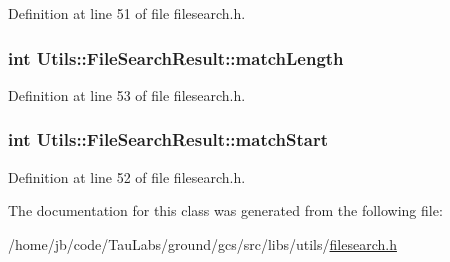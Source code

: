 \-Definition at line 51 of file filesearch.\-h.

\hypertarget{class_utils_1_1_file_search_result_a57bcfdc2bdae981ab37fb9e27bb244c5}{
\subsubsection[{match\-Length}]{\setlength{\rightskip}{0pt plus 5cm}int {\bf \-Utils\-::\-File\-Search\-Result\-::match\-Length}}}\label{class_utils_1_1_file_search_result_a57bcfdc2bdae981ab37fb9e27bb244c5}


\-Definition at line 53 of file filesearch.\-h.

\hypertarget{class_utils_1_1_file_search_result_a98b3933b899ba1a74c80c1910ff7701f}{
\subsubsection[{match\-Start}]{\setlength{\rightskip}{0pt plus 5cm}int {\bf \-Utils\-::\-File\-Search\-Result\-::match\-Start}}}\label{class_utils_1_1_file_search_result_a98b3933b899ba1a74c80c1910ff7701f}


\-Definition at line 52 of file filesearch.\-h.



\-The documentation for this class was generated from the following file\-:\begin{DoxyCompactItemize}
\item 
/home/jb/code/\-Tau\-Labs/ground/gcs/src/libs/utils/\hyperlink{filesearch_8h}{filesearch.\-h}\end{DoxyCompactItemize}

